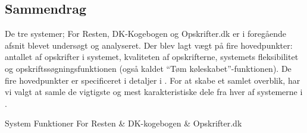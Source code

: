 \subsection{Sammendrag}
\label{subsec:eksisterende.sammendrag}

De tre systemer; For Resten, DK-Kogebogen og Opskrifter.dk er i foregående afsnit blevet undersøgt og analyseret. Der blev lagt vægt på fire hovedpunkter: antallet af opskrifter i systemet, kvaliteten af opskrifterne, systemets fleksibilitet og opskriftssøgningsfunktionen (også kaldet ``Tøm køleskabet''-funktionen). De fire hovedpunkter er specificeret i detaljer i . For at skabe et samlet overblik, har vi valgt at samle de vigtigste og mest karakteristiske dele fra hver af systemerne i .

                                            {System}
       { Funktioner                }{ For Resten   & DK-kogebogen   & Opskrifter.dk }{
}

